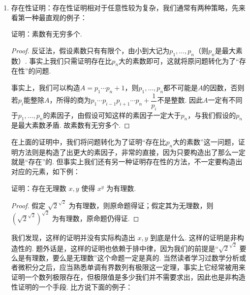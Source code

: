 \begin{enumerate}
    \item 存在性证明：存在性证明相对于任意性较为复杂，我们通常有两种策略，先来看第一种最直观的例子：
          \begin{example}{}{}
              证明：素数有无穷多个.
          \end{example}
          \begin{proof}
              反证法，假设素数只有有限个，由小到大记为$p_1,\ldots,p_n$（则$p_n$是最大素数）. 事实上我们只需证明存在比$p_n$大的素数即可，这就将原问题转化为了``存在性''的问题.

              事实上，我们可以构造$A=p_1\cdots p_n+1$，则$p_1,\ldots,p_n$都不可能是$A$的因数，否则若$p_i$能整除$A$，所得的商为$p_1\cdots p_{i-1}p_{i+1}\cdots p_n+\dfrac{1}{p_i}$不是整数. 因此$A$一定有不同于$p_1,\ldots,p_n$的素因子，由假设可知这样的素因子一定大于$p_n$，与我们假设的$p_n$是最大素数矛盾. 故素数有无穷多个.
          \end{proof}

          在上面的证明中，我们将问题转化为了证明``存在比$p_n$大的素数''这一问题，证明方法则是构造了出更大的素因子，非常的直接，因为只要构造出了那么一定就是``存在''的. 但事实上我们还有另一种证明存在性的方法，不一定要构造出对应的元素，如下例：
          \begin{example*}{}{}
              证明：存在无理数 $x, y$ 使得 $x^y$ 为有理数.
          \end{example*}
          \begin{proof}
              假定 $\sqrt{2}^{\sqrt{2}}$ 为有理数，则原命题得证；假定其为无理数，则 $\left(\sqrt{2}^{\sqrt{2}}\right)^{\sqrt{2}}$ 为有理数，原命题仍得证.
          \end{proof}

          我们发现，这样的证明并没有实际构造出 $x, y$ 到底是什么. 这样的证明是非构造性的. 题外话是，这样的证明也依赖于排中律，因为我们的前提是``$\sqrt{2}^{\sqrt{2}}$ 要么是有理数，要么是无理数''这个命题一定是真的. 当然读者学习过数学分析或者微积分之后，应当熟悉单调有界数列有极限这一定理，事实上它经常被用来证明一个数列极限存在，但极限值是多少我们并不需要求出，因此也是非构造性证明的一个手段. 比方说下面的例子：


\end{enumerate}

